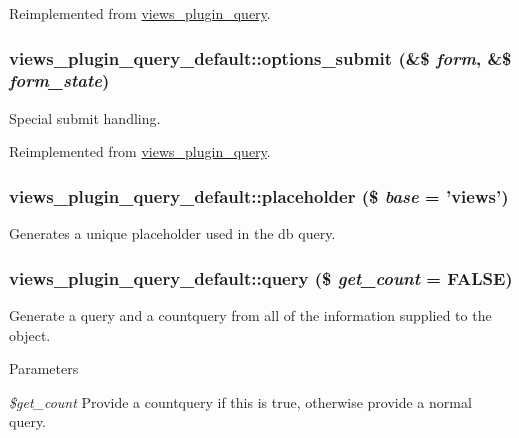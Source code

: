Reimplemented from \hyperlink{classviews__plugin__query_a9d5e25ce4c997a4e341ef3c3a464736a}{views\_\-plugin\_\-query}.\hypertarget{classviews__plugin__query__default_aac79abee5640db26687e1794097e0798}{
\subsubsection[{options\_\-submit}]{\setlength{\rightskip}{0pt plus 5cm}views\_\-plugin\_\-query\_\-default::options\_\-submit (\&\$ {\em form}, \/  \&\$ {\em form\_\-state})}}
\label{classviews__plugin__query__default_aac79abee5640db26687e1794097e0798}
Special submit handling. 

Reimplemented from \hyperlink{classviews__plugin__query_adf4a74ae9fba5fbbc9a742b5b4947437}{views\_\-plugin\_\-query}.\hypertarget{classviews__plugin__query__default_acd5a17da450663801421a3195400cb19}{
\subsubsection[{placeholder}]{\setlength{\rightskip}{0pt plus 5cm}views\_\-plugin\_\-query\_\-default::placeholder (\$ {\em base} = {\ttfamily 'views'})}}
\label{classviews__plugin__query__default_acd5a17da450663801421a3195400cb19}
Generates a unique placeholder used in the db query. \hypertarget{classviews__plugin__query__default_a64cd97fbcd03866806822ef01b9306ff}{
\subsubsection[{query}]{\setlength{\rightskip}{0pt plus 5cm}views\_\-plugin\_\-query\_\-default::query (\$ {\em get\_\-count} = {\ttfamily FALSE})}}
\label{classviews__plugin__query__default_a64cd97fbcd03866806822ef01b9306ff}
Generate a query and a countquery from all of the information supplied to the object.


\begin{DoxyParams}{Parameters}
\item[{\em \$get\_\-count}]Provide a countquery if this is true, otherwise provide a normal query. \end{DoxyParams}


